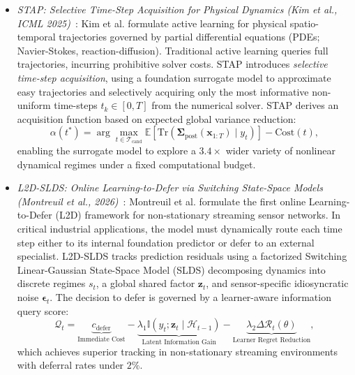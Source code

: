 \begin{itemize}[leftmargin=*]
    \item \emph{STAP: Selective Time-Step Acquisition for Physical Dynamics (Kim et al., ICML 2025)}~\cite{kim2025stap}: Kim et al. formulate active learning for physical spatio-temporal trajectories governed by partial differential equations (PDEs; Navier-Stokes, reaction-diffusion). Traditional active learning queries full trajectories, incurring prohibitive solver costs. STAP introduces \emph{selective time-step acquisition}, using a foundation surrogate model to approximate easy trajectories and selectively acquiring only the most informative non-uniform time-steps $t_k \in [0, T]$ from the numerical solver. STAP derives an acquisition function based on expected global variance reduction:
    \begin{equation}
        \alpha(t^*) = \arg\max_{t \in \mathcal{T}_{\text{cand}}} \mathbb{E}\left[ \text{Tr}\left(\mathbf{\Sigma}_{\text{post}}(\mathbf{x}_{1:T}) \mid y_t\right) \right] - \text{Cost}(t),
    \end{equation}
    enabling the surrogate model to explore a $3.4\times$ wider variety of nonlinear dynamical regimes under a fixed computational budget.

    \item \emph{L2D-SLDS: Online Learning-to-Defer via Switching State-Space Models (Montreuil et al., 2026)}~\cite{montreuil2026l2dslds}: Montreuil et al. formulate the first online Learning-to-Defer (L2D) framework for non-stationary streaming sensor networks. In critical industrial applications, the model must dynamically route each time step either to its internal foundation predictor or defer to an external specialist. L2D-SLDS tracks prediction residuals using a factorized Switching Linear-Gaussian State-Space Model (SLDS) decomposing dynamics into discrete regimes $s_t$, a global shared factor $\mathbf{z}_t$, and sensor-specific idiosyncratic noise $\mathbf{\epsilon}_t$. The decision to defer is governed by a learner-aware information query score:
    \begin{equation}
        \mathcal{Q}_t = \underbrace{c_{\text{defer}}}_{\text{Immediate Cost}} - \underbrace{\lambda_1 \mathbb{I}\left(y_t; \mathbf{z}_t \mid \mathcal{H}_{t-1}\right)}_{\text{Latent Information Gain}} - \underbrace{\lambda_2 \Delta \mathcal{R}_t(\theta)}_{\text{Learner Regret Reduction}},
    \end{equation}
    which achieves superior tracking in non-stationary streaming environments with deferral rates under $2\%$.


\end{itemize}
